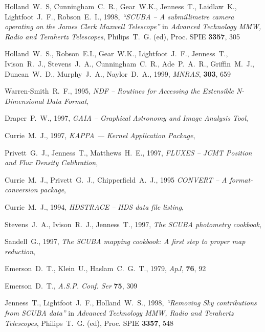 \documentclass[twoside,11pt]{starlink}
\begin{document}
\clearpage
\begin{thebibliography}{}

Holland~W.~S, Cunningham~C.~R., Gear~W.K., Jenness~T., Laidlaw~K.,
Lightfoot~J.~F., Robson~E.~I., 1998, \textit{``SCUBA -- A submillimetre camera
operating on the James Clerk Maxwell Telescope''} in \textit{Advanced
Technology MMW, Radio and Terahertz Telescopes}, Philips~T.~G. (ed),
Proc. SPIE \textbf{3357}, 305

Holland~W.~S., Robson~E.I., Gear~W.K., Lightfoot~J.~F., Jenness~T.,
Ivison~R.~J., Stevens~J.~A., Cunningham~C.~R., Ade~P.~A.~R.,
Griffin~M.~J., Duncan~W.~D., Murphy~J.~A., Naylor~D.~A., 1999,
\textit{MNRAS}, \textbf{303}, 659

Warren-Smith~R.~F., 1995, \textit{NDF -- Routines for Accessing the Extensible
N-Dimensional Data Format}, 

Draper~P.~W., 1997, \textit{GAIA -- Graphical Astronomy and Image Analysis Tool},

Currie~M.~J., 1997, \textit{KAPPA --- Kernel Application Package},

Privett~G.~J., Jenness~T., Matthews~H.~E., 1997, \textit{FLUXES --
JCMT Position and Flux Density Calibration},

Currie~M.~J., Privett~G.~J., Chipperfield~A.~J., 1995 \textit{CONVERT --
A format-conversion package}, 

Currie~M.~J., 1994, \textit{HDSTRACE -- HDS data file listing},

Stevens~J.~A., Ivison~R.~J., Jenness~T., 1997, \textit{The SCUBA photometry
cookbook},

Sandell~G., 1997, \textit{The SCUBA mapping cookbook: A first step to
proper map reduction}, 

Emerson~D.~T., Klein~U., Haslam~C.~G.~T., 1979, \textit{ApJ}, \textbf{76}, 92

Emerson~D.~T., \textit{A.S.P. Conf. Ser} \textbf{75}, 309

Jenness~T., Lightfoot~J.~F., Holland~W.~S., 1998,
\textit{``Removing Sky contributions from SCUBA data''} in \textit{Advanced
Technology MMW, Radio and Terahertz Telescopes}, Philips~T.~G. (ed),
Proc. SPIE \textbf{3357}, 548


\end{thebibliography}
\end{document}
